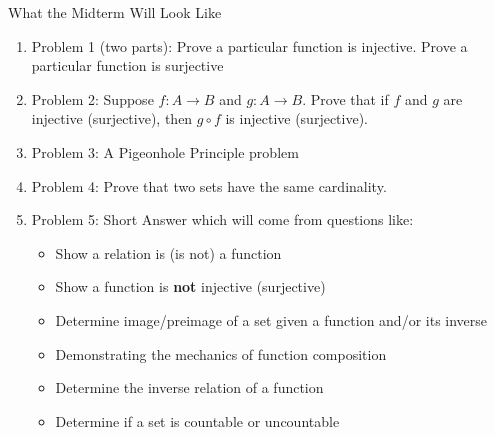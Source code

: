 \documentclass[12pt]{article}
\renewcommand{\emph}[1]{\textsf{\textbf{#1}}}
\newcommand{\be}{\begin{enumerate}}
\newcommand{\ee}{\end{enumerate}}
\begin{document}
\newpage
\begin{center} What the Midterm Will Look Like \end{center}
\be
\item Problem 1 (two parts): Prove a particular function is injective. Prove a particular function is surjective
\item Problem 2: Suppose $f:A \to B$ and $g:A \to B$. Prove that if $f$ and $g$ are injective (surjective), then $g \circ f$ is injective (surjective).
\item Problem 3: A Pigeonhole Principle problem
\item Problem 4: Prove that two sets have the same cardinality.
\item Problem 5: Short Answer which will come from questions like:
	\begin{itemize}
	\item Show a relation is (is not) a function
	\item Show a function is \emph{not} injective (surjective)
	\item Determine image/preimage of a set given a function and/or its inverse
	\item Demonstrating the mechanics of function composition
	\item Determine the inverse relation of a function
	\item Determine if a set is countable or uncountable
	\end{itemize}
\ee
\end{document}
